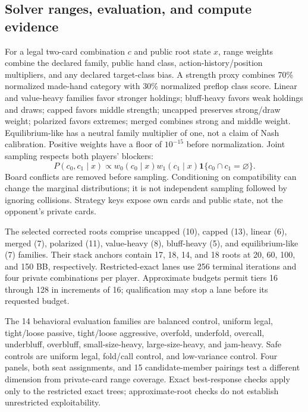 \subsection{Solver ranges, evaluation, and compute evidence}
For a legal two-card combination \(c\) and public root state \(x\), range weights combine the declared family, public hand class, action-history/position multipliers, and any declared target-class bias. A strength proxy combines 70\% normalized made-hand category with 30\% normalized preflop class score. Linear and value-heavy families favor stronger holdings; bluff-heavy favors weak holdings and draws; capped favors middle strength; uncapped preserves strong/draw weight; polarized favors extremes; merged combines strong and middle weight. Equilibrium-like has a neutral family multiplier of one, not a claim of Nash calibration. Positive weights have a floor of \(10^{-15}\) before normalization. Joint sampling respects both players' blockers:
\begin{equation}
P(c_0,c_1\mid x)\propto w_0(c_0\mid x)w_1(c_1\mid x)
\mathbf1\{c_0\cap c_1=\varnothing\}.
\end{equation}
Board conflicts are removed before sampling. Conditioning on compatibility can change the marginal distributions; it is not independent sampling followed by ignoring collisions. Strategy keys expose own cards and public state, not the opponent's private cards.

The selected corrected roots comprise uncapped (10), capped (13), linear (6), merged (7), polarized (11), value-heavy (8), bluff-heavy (5), and equilibrium-like (7) families. Their stack anchors contain 17, 18, 14, and 18 roots at 20, 60, 100, and 150 BB, respectively. Restricted-exact lanes use 256 terminal iterations and four private combinations per player. Approximate budgets permit tiers 16 through 128 in increments of 16; qualification may stop a lane before its requested budget.

The 14 behavioral evaluation families are balanced control, uniform legal, tight/loose passive, tight/loose aggressive, overfold, underfold, overcall, underbluff, overbluff, small-size-heavy, large-size-heavy, and jam-heavy. Safe controls are uniform legal, fold/call control, and low-variance control. Four panels, both seat assignments, and 15 candidate-member pairings test a different dimension from private-card range coverage. Exact best-response checks apply only to the restricted exact trees; approximate-root checks do not establish unrestricted exploitability.

